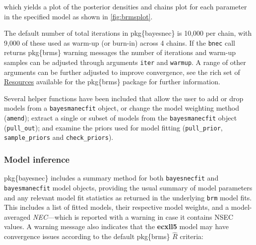 \documentclass[
]{jss}
\begin{document}
which yields a plot of the posterior densities and chains plot for each
parameter in the specified model as shown in \autoref{fig:brmsplot}.

The default number of total iterations in pkg\{bayesnec\} is 10,000 per
chain, with 9,000 of these used as warm-up (or burn-in) across 4 chains.
If the \texttt{bnec} call returns pkg\{brms\} warning messages the
number of iterations and warm-up samples can be adjusted through
arguments \texttt{iter} and \texttt{warmup}. A range of other arguments
can be further adjusted to improve convergence, see the rich set of
\href{https://github.com/paul-buerkner/brms}{Resources} available for
the pkg\{brms\} package for further information.

Several helper functions have been included that allow the user to add
or drop models from a \texttt{bayesmanecfit} object, or change the model
weighting method (\texttt{amend}); extract a single or subset of models
from the \texttt{bayesmanecfit} object (\texttt{pull\_out}); and examine
the priors used for model fitting (\texttt{pull\_prior},
\texttt{sample\_priors} and \texttt{check\_priors}).

\hypertarget{model-inference}{%
\subsubsection{Model inference}\label{model-inference}}

pkg\{bayesnec\} includes a summary method for both \texttt{bayesnecfit}
and \texttt{bayesmanecfit} model objects, providing the usual summary of
model parameters and any relevant model fit statistics as returned in
the underlying \texttt{brm} model fits. This includes a list of fitted
models, their respective model weights, and a model-averaged
\emph{NEC}---which is reported with a warning in case it contains NSEC
values. A warning message also indicates that the \textbf{ecxll5} model
may have convergence issues according to the default pkg\{brms\}
\(\widehat{R}\) criteria:
\end{document}
